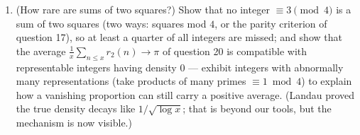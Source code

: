 \begin{problem}
\begin{enumerate}[resume]
\[        xd\Bigr\rfloor = \frac{\pi x}4 + O(\sqrt x),
        \]
        and deduce --- removing the floors carefully ---
        Leibniz's series
        \[
        1 - \frac13 + \frac15 - \frac17 + \dots = \frac\pi4 .
        \]
        The alternating series of odd reciprocals \emph{is} the
        average excess of divisors $\equiv 1$ over divisors
        $\equiv 3$: analysis computed by arithmetic.
  \item (How rare are sums of two squares?) Show that no
        integer $\equiv 3 \pmod 4$ is a sum of two squares (two
        ways: squares mod $4$, or the parity criterion of
        question 17), so at least a quarter of all integers are
        missed; and show that the average $\frac1x\sum_{n\leq
        x}r_2(n) \to \pi$ of question 20 is compatible with
        representable integers having density $0$ ---
        exhibit integers with abnormally many representations
        (take products of many primes $\equiv 1 \bmod 4$) to
        explain how a vanishing proportion can still carry a
        positive average. (Landau proved the true density decays
        like $1/\sqrt{\log x}$; that is beyond our tools, but
        the mechanism is now visible.)
\end{enumerate}


\end{problem}
